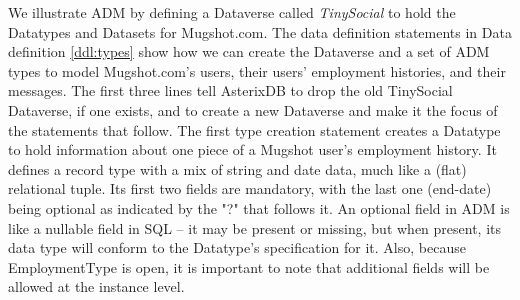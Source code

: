 We illustrate ADM by defining a Dataverse called \emph{TinySocial} to hold the Datatypes and Datasets for Mugshot.com.
The data definition statements in Data definition \ref{ddl:types} show how we can create the Dataverse and a set of ADM types to model Mugshot.com's users, their users' employment histories, and their messages. 
The first three lines tell AsterixDB to drop the old TinySocial Dataverse, if one exists, and to create a new Dataverse and make it the focus of the statements that follow. 
The first type creation statement creates a Datatype to hold information about one piece of a Mugshot user's employment history. 
It defines a record type with a mix of string and date data, much like a (flat) relational tuple.
Its first two fields are mandatory, with the last one (end-date) being optional as indicated by the "?" that follows it.
An optional field in ADM is like a nullable field in SQL -- it may be present or missing, but when present, its data type will conform to the Datatype's specification for it. Also, because EmploymentType is open, it is important to note that additional fields will be allowed at the instance level. 

